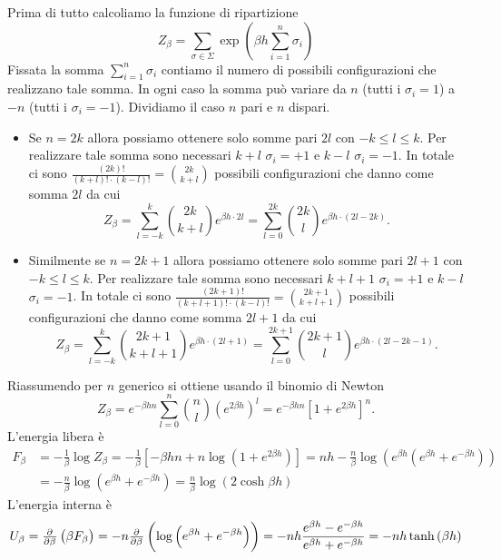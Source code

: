 \begin{solution}
    Prima di tutto calcoliamo la funzione di ripartizione
    \[
        Z_\beta = \sum_{\sigma \in \Sigma} \exp\left(\beta h \sum_{i=1}^{n}\sigma_i\right)
    \]
    Fissata la somma $ \sum_{i=1}^{n}\sigma_i $ contiamo il numero di possibili configurazioni che realizzano tale somma. In ogni caso la somma può variare da $ n $ (tutti i $ \sigma_i = 1 $) a $ -n $ (tutti i $ \sigma_i = -1 $). Dividiamo il caso $ n $ pari e $ n $ dispari.
    \begin{itemize}
        \item Se $ n = 2k $ allora possiamo ottenere solo somme pari $ 2l $ con $ -k \leq l \leq k $. Per realizzare tale somma sono necessari $ k + l $ $ \sigma_i = +1 $ e $ k - l $ $ \sigma_i = -1 $. In totale ci sono $ \frac{(2k)!}{(k+l)! \cdot (k-l)!} = \binom{2k}{k+l} $ possibili configurazioni che danno come somma $ 2l $ da cui
        \[
            Z_\beta = \sum_{l = -k}^{k} \binom{2k}{k+l} e^{\beta h \cdot 2l} = \sum_{l = 0}^{2k} \binom{2k}{l} e^{\beta h \cdot (2l-2k)}.
        \]
        \item Similmente se $ n = 2k+1 $ allora possiamo ottenere solo somme pari $ 2l+1 $ con $ -k \leq l \leq k $. Per realizzare tale somma sono necessari $ k+l+1 $ $ \sigma_i = +1 $ e $ k-l $ $ \sigma_i = -1 $. In totale ci sono $ \frac{(2k+1)!}{(k+l+1)! \cdot (k-l)!} = \binom{2k+1}{k+l+1} $ possibili configurazioni che danno come somma $ 2l+1 $ da cui
        \[
            Z_\beta = \sum_{l = -k}^{k} \binom{2k+1}{k+l+1} e^{\beta h \cdot (2l+1)} = \sum_{l = 0}^{2k+1} \binom{2k+1}{l} e^{\beta h \cdot (2l-2k-1)}.
        \]
    \end{itemize}
    Riassumendo per $ n $ generico si ottiene usando il binomio di Newton
    \[
        Z_\beta = e^{-\beta h n} \sum_{l=0}^{n} \binom{n}{l} \left(e^{2 \beta h}\right)^l = e^{-\beta h n} \left[1 + e^{2\beta h}\right]^{n}.
    \]
    L'energia libera è
    \begin{align*}
        F_\beta & = - \frac{1}{\beta} \log{Z_\beta} = - \frac{1}{\beta} \left[-\beta h n + n \log{\left(1+e^{2\beta h}\right)}\right] = n h - \frac{n}{\beta} \log{\left(e^{\beta h}(e^{\beta h}+e^{-\beta h})\right)} \\
        & = -\frac{n}{\beta} \log{\left(e^{\beta h}+e^{-\beta h}\right)} = \frac{n}{\beta} \log(2\cosh{\beta h})
    \end{align*}
    L'energia interna è
    \[
        U_\beta = \pd{}{\beta} \left(\beta F_\beta\right) = -n \pd{}{\beta} \left(\log{\left(e^{\beta h}+e^{-\beta h}\right)}\right) = -n h \frac{e^{\beta h} - e^{-\beta h}}{e^{\beta h}+e^{-\beta h}} = - nh \tanh{(\beta h)}
\]
\end{solution}
